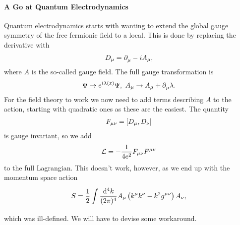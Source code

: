 \paragraph{A Go at Quantum Electrodynamics}
Quantum electrodynamics starts with wanting to extend the global gauge symmetry of the free fermionic field to a local. This is done by replacing the derivative with
\begin{align*}
	D_{\mu} = \partial^{}_{\mu} - iA_{\mu},
\end{align*}
where $A$ is the so-called gauge field. The full gauge transformation is
\begin{align*}
	\Psi\to e^{i\lambda(x)}\Psi,\ A_{\mu}\to A_{\mu} + \partial^{}_{\mu}\lambda.
\end{align*}
For the field theory to work we now need to add terms describing $A$ to the action, starting with quadratic ones as these are the easiest. The quantity
\begin{align*}
	F_{\mu\nu} = \comm{D_{\mu}}{D_{\nu}}
\end{align*}
is gauge invariant, so we add
\begin{align*}
	\mathcal{L} = -\frac{1}{4e^{2}}F_{\mu\nu}F^{\mu\nu}
\end{align*}
to the full Lagrangian. This doesn't work, however, as we end up with the momentum space action
\begin{align*}
	S = \frac{1}{2}\int\limits_{}^{}\frac{\dd[4]{k}}{(2\pi)^{4}}A_{\mu}\left(k^{\mu}k^{\nu} - k^{2}g^{\mu\nu}\right)A_{\nu},
\end{align*}
which was ill-defined. We will have to devise some workaround.

